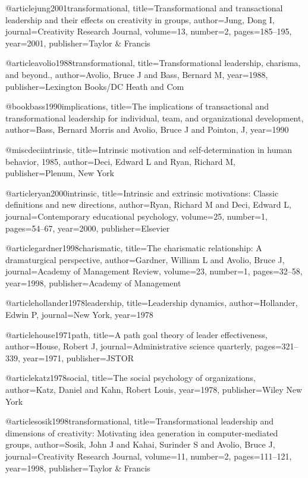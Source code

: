 @article{jung2001transformational,
  title={Transformational and transactional leadership and their effects on creativity in groups},
  author={Jung, Dong I},
  journal={Creativity Research Journal},
  volume={13},
  number={2},
  pages={185--195},
  year={2001},
  publisher={Taylor \& Francis}
}

@article{avolio1988transformational,
  title={Transformational leadership, charisma, and beyond.},
  author={Avolio, Bruce J and Bass, Bernard M},
  year={1988},
  publisher={Lexington Books/DC Heath and Com}
}

@book{bass1990implications,
  title={The implications of transactional and transformational leadership for individual, team, and organizational development},
  author={Bass, Bernard Morris and Avolio, Bruce J and Pointon, J},
  year={1990}
}

@misc{deciintrinsic,
  title={Intrinsic motivation and self-determination in human behavior, 1985},
  author={Deci, Edward L and Ryan, Richard M},
  publisher={Plenum, New York}
}

@article{ryan2000intrinsic,
  title={Intrinsic and extrinsic motivations: Classic definitions and new directions},
  author={Ryan, Richard M and Deci, Edward L},
  journal={Contemporary educational psychology},
  volume={25},
  number={1},
  pages={54--67},
  year={2000},
  publisher={Elsevier}
}

@article{gardner1998charismatic,
  title={The charismatic relationship: A dramaturgical perspective},
  author={Gardner, William L and Avolio, Bruce J},
  journal={Academy of Management Review},
  volume={23},
  number={1},
  pages={32--58},
  year={1998},
  publisher={Academy of Management}
}

@article{hollander1978leadership,
  title={Leadership dynamics},
  author={Hollander, Edwin P},
  journal={New York},
  year={1978}
}

@article{house1971path,
  title={A path goal theory of leader effectiveness},
  author={House, Robert J},
  journal={Administrative science quarterly},
  pages={321--339},
  year={1971},
  publisher={JSTOR}
}

@article{katz1978social,
  title={The social psychology of organizations},
  author={Katz, Daniel and Kahn, Robert Louis},
  year={1978},
  publisher={Wiley New York}
}

@article{sosik1998transformational,
  title={Transformational leadership and dimensions of creativity: Motivating idea generation in computer-mediated groups},
  author={Sosik, John J and Kahai, Surinder S and Avolio, Bruce J},
  journal={Creativity Research Journal},
  volume={11},
  number={2},
  pages={111--121},
  year={1998},
  publisher={Taylor \& Francis}
}

